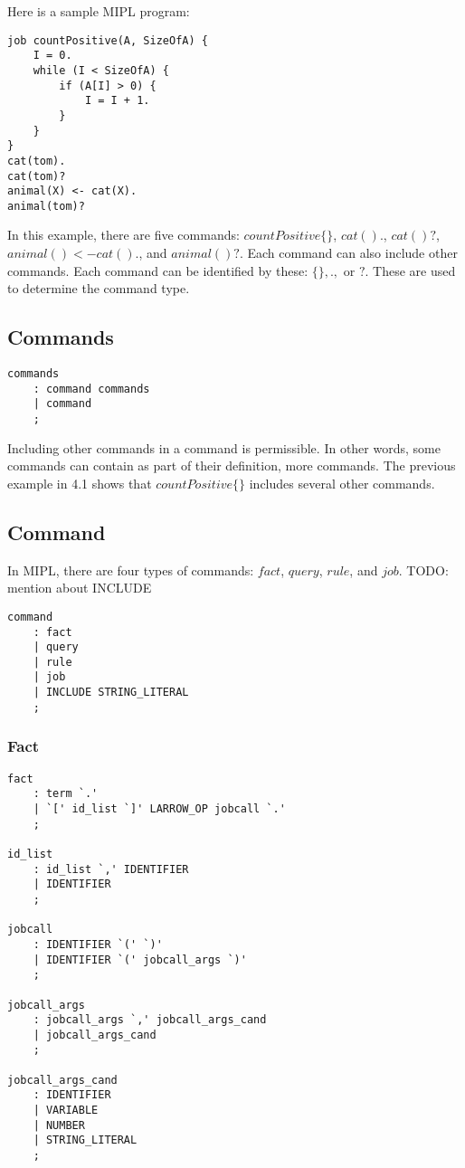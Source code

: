 \documentclass[prodmode,acmtecs]{acmsmall}
\begin{document}
Here is a sample MIPL program:

\begin{lstlisting}
job countPositive(A, SizeOfA) {
    I = 0.
    while (I < SizeOfA) {
        if (A[I] > 0) {
            I = I + 1.
        }
    }
}
cat(tom).
cat(tom)?
animal(X) <- cat(X).
animal(tom)?
\end{lstlisting}

In this example, there are five commands:
$countPositive\{\}$, $cat().$, $cat()?$, $animal() <- cat().$, and $animal()?$. Each
command can also include other commands. Each command can be identified by these:
$\{\}, .,$ or $?$. These are used to determine the command type.
\medskip

\subsection{Commands}

\begin{lstlisting}
commands
	: command commands
	| command
	;
\end{lstlisting}

Including other commands in a command is permissible. In other words, some commands
can contain as part of their definition, more commands. The previous example in 4.1
shows that $countPositive\{\}$ includes several other commands. 
\medskip

\subsection{Command}

In MIPL, there are four types of commands: $fact$, $query$, $rule$, and $job$.
TODO: mention about INCLUDE

\begin{lstlisting}
command
	: fact
	| query
	| rule
	| job
	| INCLUDE STRING_LITERAL
	;
\end{lstlisting}
\medskip


\subsubsection{Fact}
\begin{lstlisting}
fact
	: term `.'			
	| `[' id_list `]' LARROW_OP jobcall `.'
	;

id_list
	: id_list `,' IDENTIFIER
	| IDENTIFIER		
	;

jobcall
	: IDENTIFIER `(' `)'
	| IDENTIFIER `(' jobcall_args `)'
	;

jobcall_args
	: jobcall_args `,' jobcall_args_cand
	| jobcall_args_cand
	;

jobcall_args_cand
	: IDENTIFIER
	| VARIABLE
	| NUMBER
	| STRING_LITERAL
	;
\end{lstlisting}
\end{document}
